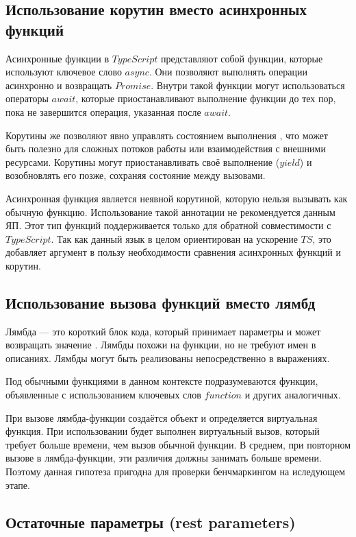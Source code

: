 \documentclass{mipt-thesis-bs}
\begin{document}
\subsection{Использование корутин вместо асинхронных функций}

Асинхронные функции в $TypeScript$ представляют собой функции,
которые используют ключевое слово $async$. Они позволяют выполнять
операции асинхронно и возвращать $Promise$. Внутри такой функции
могут использоваться операторы $await$, которые приостанавливают
выполнение функции до тех пор, пока не завершится операция,
указанная после $await$.

Корутины же позволяют явно управлять состоянием выполнения \cite{cplusplus}, что может
быть полезно для сложных потоков работы или взаимодействия
с внешними ресурсами. Корутины могут приостанавливать своё
выполнение ($yield$) и возобновлять его позже, сохраняя
состояние между вызовами.

Асинхронная функция является неявной корутиной, которую нельзя
вызывать как обычную функцию. Использование такой аннотации
не рекомендуется данным ЯП. Этот тип функций поддерживается
только для обратной совместимости с $TypeScript$.
Так как данный язык в целом ориентирован на ускорение $TS$, это
добавляет аргумент в пользу необходимости сравнения асинхронных
функций и корутин.

\subsection{Использование вызова функций вместо лямбд}

Лямбда — это короткий блок кода, который принимает параметры
и может возвращать значение \cite{cplusplus} \cite{tsspec}.
Лямбды похожи на функции, но не требуют имен
в описаниях. Лямбды могут быть реализованы непосредственно в выражениях.

Под обычными функциями в данном контексте подразумеваются
функции, объявленные с использованием ключевых слов $function$
и других аналогичных.

При вызове лямбда-функции создаётся объект и определяется
виртуальная функция. При использовании будет
выполнен виртуальный вызов, который требует больше времени,
чем вызов обычной функции. В среднем, при повторном вызове
в лямбда-функции, эти различия должны занимать больше времени.
Поэтому данная гипотеза пригодна для проверки бенчмаркингом
на иследующем этапе.

\subsection{Остаточные параметры (rest parameters)}
\end{document}
